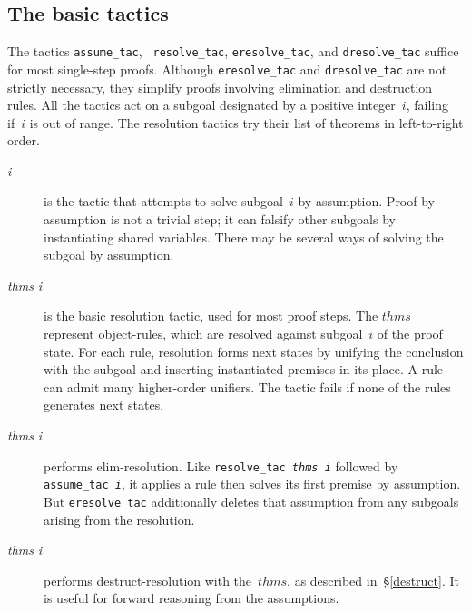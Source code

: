 \subsection{The basic tactics}
The tactics {\tt assume_tac}, {\tt
resolve_tac}, {\tt eresolve_tac}, and {\tt dresolve_tac} suffice for most
single-step proofs.  Although {\tt eresolve_tac} and {\tt dresolve_tac} are
not strictly necessary, they simplify proofs involving elimination and
destruction rules.  All the tactics act on a subgoal designated by a
positive integer~$i$, failing if~$i$ is out of range.  The resolution
tactics try their list of theorems in left-to-right order.

\begin{description}
\item[ {\it i}] is the tactic that attempts to solve
subgoal~$i$ by assumption.  Proof by assumption is not a trivial step; it
can falsify other subgoals by instantiating shared variables.  There may be
several ways of solving the subgoal by assumption.

\item[ {\it thms} {\it i}]
is the basic resolution tactic, used for most proof steps.  The $thms$
represent object-rules, which are resolved against subgoal~$i$ of the proof
state.  For each rule, resolution forms next states by unifying the
conclusion with the subgoal and inserting instantiated premises in its
place.  A rule can admit many higher-order unifiers.  The tactic fails if
none of the rules generates next states.

\item[ {\it thms} {\it i}] 
performs elim-resolution.  Like
\hbox{\tt resolve_tac {\it thms} {\it i}} followed by \hbox{\tt assume_tac
{\it i}}, it applies a rule then solves its first premise by assumption.
But {\tt eresolve_tac} additionally deletes that assumption from any
subgoals arising from the resolution.


\item[ {\it thms} {\it i}] 
performs destruct-resolution with the~$thms$, as described
in~\S\ref{destruct}.  It is useful for forward reasoning from the
assumptions.
\end{description}

